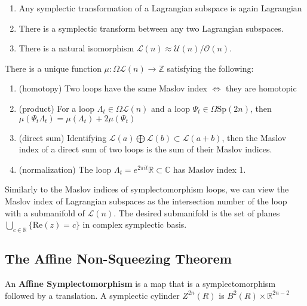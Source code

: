 \begin{lem}

\begin{enumerate}
    \item Any symplectic transformation of a Lagrangian subspace is again Lagrangian
    \item There is a symplectic transform between any two Lagrangian subspaces.
    \item There is a natural isomorphism $\mathcal{L}(n) \approx \mathcal{U}(n)/\mathcal{O}(n)$.
\end{enumerate}

\end{lem}

\begin{thm}

There is a unique function $\mu: \Omega \mathcal{L}(n) \to \mathbb{Z}$ satisfying the following:

\begin{enumerate}
    \item (homotopy) Two loops have the same Maslov index $\iff$ they are homotopic
    \item (product) For a loop $\Lambda_t \in \Omega \mathcal{L}(n)$ and a loop $\Psi_t \in \Omega \mathrm{Sp}(2n)$, then $\mu(\Psi_t \Lambda_t) = \mu(\Lambda_t) + 2 \mu(\Psi_t)$
    \item (direct sum) Identifying $\mathcal{L}(a) \bigoplus \mathcal{L}(b) \subset \mathcal{L}(a+b)$, then the Maslov index of a direct sum of two loops is the sum of their Maslov indices.
    \item (normalization)  The loop $\Lambda_t = e^{2 \pi i t} \mathbb{R} \subset \mathbb{C}$ has Maslov index 1.
    
\end{enumerate}

\end{thm}

Similarly to the Maslov indices of symplectomorphism loops, we can view the Maslov index of Lagrangian subspaces as the intersection number of the loop with a submanifold of $\mathcal{L}(n)$. The desired submanifold is the set of planes $\bigcup_{c \in \mathbb{R}} \{\mathrm{Re}(z) = c\}$ in complex symplectic basis.


\subsection{The Affine Non-Squeezing Theorem}

\begin{defn}

An \textbf{Affine Symplectomorphism} is a map that is a symplectomorphism followed by a translation. A symplectic cylinder $Z^{2n}(R)$ is $B^2 (R) \times \mathbb{R}^{2n-2}$

\end{defn}

